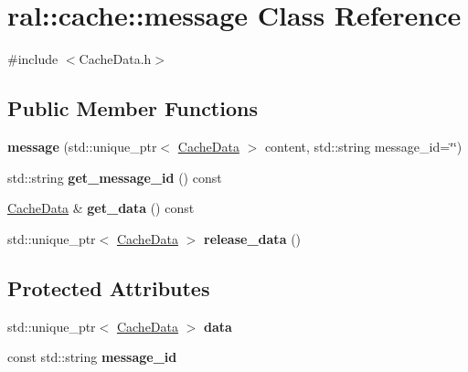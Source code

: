 \hypertarget{classral_1_1cache_1_1message}{}\section{ral\+:\+:cache\+:\+:message Class Reference}
\label{classral_1_1cache_1_1message}


{\ttfamily \#include $<$Cache\+Data.\+h$>$}

\subsection*{Public Member Functions}
\begin{DoxyCompactItemize}
\item 
\mbox{\label{classral_1_1cache_1_1message_a35d74ef18f61184f2597b799465972e6}} 
{\bfseries message} (std\+::unique\+\_\+ptr$<$ \hyperlink{classral_1_1cache_1_1CacheData}{Cache\+Data} $>$ content, std\+::string message\+\_\+id=\char`\"{}\char`\"{})
\item 
\mbox{\label{classral_1_1cache_1_1message_a935ba0082352b3210a13b54faf528774}} 
std\+::string {\bfseries get\+\_\+message\+\_\+id} () const
\item 
\mbox{\label{classral_1_1cache_1_1message_a1eb481914a48805f5995194e011fde6d}} 
\hyperlink{classral_1_1cache_1_1CacheData}{Cache\+Data} \& {\bfseries get\+\_\+data} () const
\item 
\mbox{\label{classral_1_1cache_1_1message_ab4f864c9a11b2a9a782a1bf2f90d67e2}} 
std\+::unique\+\_\+ptr$<$ \hyperlink{classral_1_1cache_1_1CacheData}{Cache\+Data} $>$ {\bfseries release\+\_\+data} ()
\end{DoxyCompactItemize}
\subsection*{Protected Attributes}
\begin{DoxyCompactItemize}
\item 
\mbox{\label{classral_1_1cache_1_1message_a16360130b0dfc4c47fda3d81acd10bcd}} 
std\+::unique\+\_\+ptr$<$ \hyperlink{classral_1_1cache_1_1CacheData}{Cache\+Data} $>$ {\bfseries data}
\item 
\mbox{\label{classral_1_1cache_1_1message_a0022a3af29dbb1373e6b843d83196d4b}} 
const std\+::string {\bfseries message\+\_\+id}
\end{DoxyCompactItemize}



